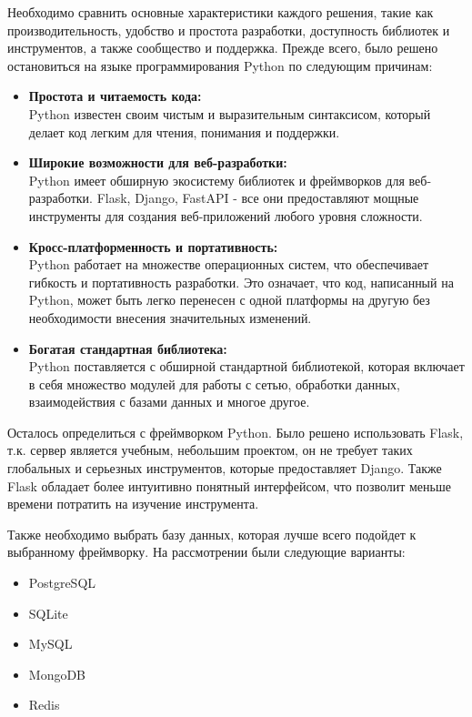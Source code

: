 \documentclass[12pt, russian]{extarticle}
\begin{document}
\begin{spacing}{1.5}
    Необходимо сравнить основные характеристики каждого решения,
    такие как производительность, удобство и простота разработки, доступность библиотек и инструментов,
    а также сообщество и поддержка. Прежде всего, было решено остановиться на языке программирования
    Python по следующим причинам:

    \begin{itemize}
        \item \textbf{Простота и читаемость кода:} \\
            Python известен своим чистым и выразительным синтаксисом,
            который делает код легким для чтения, понимания и поддержки.
        \item \textbf{Широкие возможности для веб-разработки:} \\
            Python имеет обширную экосистему библиотек и фреймворков для веб-разработки.
            Flask, Django, FastAPI - все они предоставляют мощные инструменты для создания веб-приложений
            любого уровня сложности.
        \item \textbf{Кросс-платформенность и портативность:} \\
            Python работает на множестве операционных систем, что обеспечивает гибкость и
            портативность разработки. Это означает, что код, написанный на Python,
            может быть легко перенесен с одной платформы на другую без необходимости
            внесения значительных изменений.
        \item \textbf{Богатая стандартная библиотека:} \\
            Python поставляется с обширной стандартной библиотекой, которая включает
            в себя множество модулей для работы с сетью, обработки данных, взаимодействия
            с базами данных и многое другое.
    \end{itemize}

    Осталось определиться с фреймворком Python. Было решено использовать Flask, т.к.
    сервер является учебным, небольшим проектом, он не требует таких глобальных и серьезных
    инструментов, которые предоставляет Django. Также Flask обладает более интуитивно понятный интерфейсом,
    что позволит меньше времени потратить на изучение инструмента.

    Также необходимо выбрать базу данных, которая лучше всего подойдет к выбранному фреймворку.
    На рассмотрении были следующие варианты:

    \begin{itemize}
        \item PostgreSQL
        \item SQLite
        \item MySQL
        \item MongoDB
        \item Redis
    \end{itemize}


\end{spacing}
\end{document}
